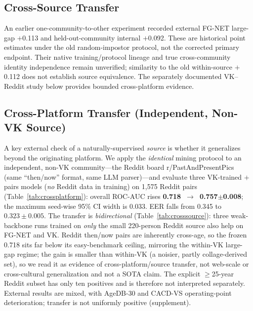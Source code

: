 \documentclass[journal]{IEEEtran}
\begin{document}
\subsection{Cross-Source Transfer}\label{sec:res-cross}
An earlier one-community-to-other experiment recorded external FG-NET large-gap $+$0.113 and held-out-community internal $+$0.092. These are historical point estimates under the old random-impostor protocol, not the corrected primary endpoint. Their native training/protocol lineage and true cross-community identity independence remain unverified; similarity to the old within-source $+$0.112 does not establish source equivalence. The separately documented VK--Reddit study below provides bounded cross-platform evidence.

\subsection{Cross-Platform Transfer (Independent, Non-VK Source)}\label{sec:res-crossplatform}
A key external check of a naturally-supervised \emph{source} is whether it generalizes beyond the originating platform. We apply the \emph{identical} mining protocol to an independent, non-VK community---the Reddit board r/PastAndPresentPics (same ``then/now'' format, same LLM parser)---and evaluate three VK-trained $+$pairs models (\emph{no} Reddit data in training) on 1{,}575 Reddit pairs (Table~\ref{tab:crossplatform}): overall ROC-AUC rises \textbf{0.718~$\rightarrow$~0.757$\pm$0.008}; the maximum seed-wise 95\% CI width is 0.033. EER falls from 0.345 to $0.323\pm0.005$. The transfer is \emph{bidirectional} (Table~\ref{tab:crosssource}): three weak-backbone runs trained on \emph{only} the small 220-person Reddit source also help on FG-NET and VK. Reddit then/now pairs are inherently cross-age, so the frozen 0.718 sits far below its easy-benchmark ceiling, mirroring the within-VK large-gap regime; the gain is smaller than within-VK (a noisier, partly collage-derived set), so we read it as evidence of cross-platform/source transfer, not web-scale or cross-cultural generalization and not a SOTA claim. The explicit $\geq$25-year Reddit subset has only ten positives and is therefore not interpreted separately. External results are mixed, with AgeDB-30 and CACD-VS operating-point deterioration; transfer is not uniformly positive (supplement).
\end{document}
